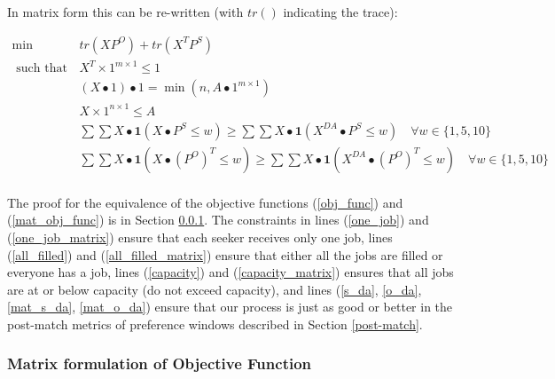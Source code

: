 In matrix form this can be re-written (with $tr()$ indicating the trace):

\begin{align}
\min \qquad & tr(XP^O) + tr(X^TP^S) \label{mat_obj_func} \\
\text{ such that } \qquad & X^T \times 1^{m \times 1}  \leq 1  \label{one_job_matrix}\\
& (X \bullet 1)\bullet 1 = \min(n,A \bullet 1^{m \times 1}) \label{all_filled_matrix}\\
& X \times 1^{n \times 1} \leq A \label{capacity_matrix} \\
& \sum \sum X \bullet\mathbf{1}(X \bullet P^S \leq w) \geq \sum \sum X \bullet\mathbf{1}(X^{DA} \bullet P^S \leq w) \quad \forall w \in \{1,5,10\} \\ \label{mat_s_da}
& \sum \sum X \bullet\mathbf{1}(X \bullet (P^O)^T \leq w) \geq \sum \sum X \bullet\mathbf{1}(X^{DA} \bullet (P^O)^T \leq w) \quad \forall w \in \{1,5,10\} \\ \label{mat_o_da}
\end{align}

The proof for the equivalence of the objective functions (\ref{obj_func}) and (\ref{mat_obj_func}) is in Section \ref{mat_obj_func_proof}. The constraints in lines (\ref{one_job}) and (\ref{one_job_matrix}) ensure that each seeker receives only one job, lines (\ref{all_filled}) and (\ref{all_filled_matrix}) ensure that either all the jobs are filled or everyone has a job, lines (\ref{capacity}) and (\ref{capacity_matrix}) ensures that all jobs are at or below capacity (do not exceed capacity), and lines (\ref{s_da}, \ref{o_da}, \ref{mat_s_da}, \ref{mat_o_da}) ensure that our process is just as good or better in the post-match metrics of preference windows described in Section \ref{post-match}.

\subsubsection{Matrix formulation of Objective Function}
\label{mat_obj_func_proof}

